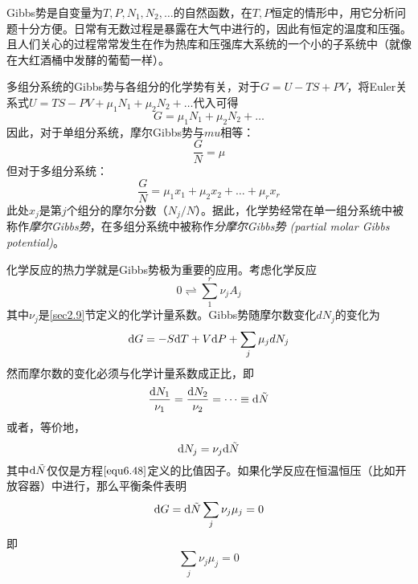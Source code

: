 Gibbs势是自变量为$T, P, N_1, N_2, \dots$的自然函数，在$T, P$恒定的情形中，用它分析问题十分方便。日常有无数过程是暴露在大气中进行的，因此有恒定的温度和压强。且人们关心的过程常常发生在作为热库和压强库大系统的一个小的子系统中（就像在大红酒桶中发酵的葡萄一样）。

多组分系统的Gibbs势与各组分的化学势有关，对于$G = U - TS + PV$，将Euler关系式$U = TS - PV + \mu_1 N_1 + \mu_2 N_2 + \dots$代入可得
\begin{equation}
\label{equ6.43}
	G = \mu_1 N_1 + \mu_2 N_2 + \dots
\end{equation}
因此，对于单组分系统，摩尔Gibbs势与$mu$相等：
\begin{equation}
\label{equ6.44}
	\frac{G}{N} = \mu
\end{equation}
但对于多组分系统：
\begin{equation}
\label{equ6.45}
	\frac{G}{N}=\mu_1x_1+\mu_2x_2+ \dots +\mu_{r}x_{r}
\end{equation}
此处$x_j$是第$j$个组分的摩尔分数（$N_j/N$）。据此，化学势经常在单一组分系统中被称作{\it 摩尔Gibbs势}，在多组分系统中被称作{\it 分摩尔Gibbs势 (partial molar Gibbs potential)}。

化学反应的热力学就是Gibbs势极为重要的应用。考虑化学反应
\begin{equation}
\label{equ6.46}
	0 \rightleftharpoons \sum_{1}^{r} \nu_j A_j
\end{equation}
其中$\nu_j$是\ref{sec2.9}节定义的化学计量系数。Gibbs势随摩尔数变化$dN_j$的变化为
\begin{equation}
\label{equ6.47}
	\mathrm{d} G = -S \mathrm{d} T + V \mathrm{d} P + \sum_j \mu_j dN_j
\end{equation}
然而摩尔数的变化必须与化学计量系数成正比，即
\begin{equation}
\label{equ6.48}
	\frac{\mathrm{d} N_1}{\nu_1}=\frac{\mathrm{d} N_2}{\nu_2}= \dots \equiv \mathrm{d} \tilde{N}
\end{equation}
或者，等价地，
\begin{equation}
\label{equ6.49}
	\mathrm{d} N_j = \nu_j \mathrm{d} \tilde{N}
\end{equation}
其中$\mathrm{d} \tilde{N}$仅仅是方程$\eqref{equ6.48}$定义的比值因子。如果化学反应在恒温恒压（比如开放容器）中进行，那么平衡条件表明
\begin{equation}
\label{equ6.50}
	\mathrm{d} G = \mathrm{d} \tilde{N} \sum_{j}\nu_{j}\mu_{j} = 0
\end{equation}
即
\begin{equation}
\label{equ6.51}
	\sum_{j} \nu_{j} \mu_{j}=0
\end{equation}

